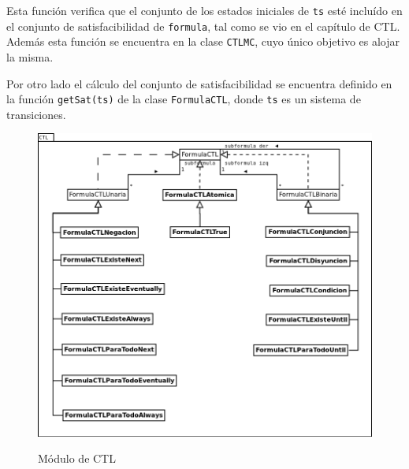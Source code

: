 Esta función verifica que el conjunto de los estados iniciales de \texttt{ts} esté
 incluído en el conjunto de satisfacibilidad de \texttt{formula}, tal como se vio
 en el capítulo de CTL.
Además esta función se encuentra en la clase \texttt{CTLMC}, cuyo único objetivo es
 alojar la misma.

Por otro lado el cálculo del conjunto de satisfacibilidad se encuentra definido en la
 función \texttt{getSat(ts)} de la clase \texttt{FormulaCTL}, donde \texttt{ts} es un
 sistema de transiciones.

\begin{figure}[hbtp]
\begin{center}
\caption{Módulo de CTL}
\includegraphics[width=\textwidth]{mc/imagenes/ctl.png}
\label{fig:modulo_CTL}
\end{center}
\end{figure}
